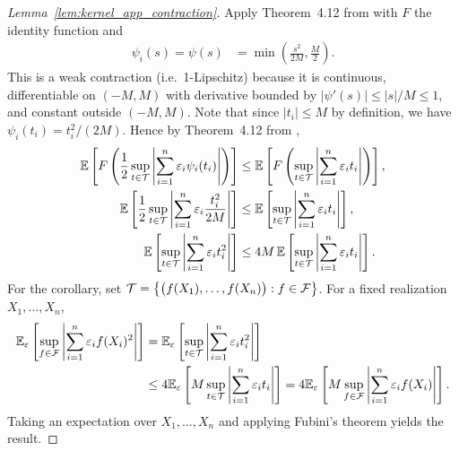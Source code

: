 \begin{proof}[Lemma~\ref{lem:kernel_app_contraction}]

  Apply Theorem~4.12 from \citet{ledoux1991probability} with $F$ the identity
  function and
  \begin{align*}
    \psi_i(s)
    = \psi(s)
    &=
    \min
    \left(
      \frac{s^2}{2M},
      \frac{M}{2}
    \right).
  \end{align*}
  This is a weak contraction
  (i.e.\ 1-Lipschitz)
  because it is continuous,
  differentiable on $(-M,M)$
  with derivative bounded by
  $|\psi'(s)| \leq |s|/M \leq 1$,
  and constant outside $(-M,M)$.
  Note that since $|t_i| \leq M$
  by definition,
  we have $\psi_i(t_i) = t_i^2 / (2M)$.
  Hence
  by Theorem~4.12
  from \citet{ledoux1991probability},
  \begin{align*}
    \mathbb{E}
    \left[
      F
      \left(
        \frac{1}{2}
        \sup_{t \in \mathcal{T}}
        \left|
        \sum_{i=1}^n
        \varepsilon_i
        \psi_i(t_i)
        \right|
      \right)
    \right]
    &\leq
    \mathbb{E}
    \left[
      F
      \left(
        \sup_{t \in \mathcal{T}}
        \left|
        \sum_{i=1}^n
        \varepsilon_i
        t_i
        \right|
      \right)
    \right], \\
    \mathbb{E}
    \left[
      \frac{1}{2}
      \sup_{t \in \mathcal{T}}
      \left|
      \sum_{i=1}^n
      \varepsilon_i
      \frac{t_i^2}{2M}
      \right|
    \right]
    &\leq
    \mathbb{E}
    \left[
      \sup_{t \in \mathcal{T}}
      \left|
      \sum_{i=1}^n
      \varepsilon_i
      t_i
      \right|
    \right], \\
    \mathbb{E}
    \left[
      \sup_{t \in \mathcal{T}}
      \left|
      \sum_{i=1}^n
      \varepsilon_i
      t_i^2
      \right|
    \right]
    &\leq
    4M \,
    \mathbb{E}
    \left[
      \sup_{t \in \mathcal{T}}
      \left|
      \sum_{i=1}^n
      \varepsilon_i
      t_i
      \right|
    \right].
  \end{align*}
  For the corollary, set
  $\mathcal{T} = \left\{\big(f(X_1), \ldots, f(X_n)\big) : f \in \mathcal{F}\right\}$.
  For a fixed realization
  $X_1, \ldots, X_n$,
  \begin{align*}
    \mathbb{E}_\varepsilon
    \left[
      \sup_{f \in \mathcal{F}}
      \left|
      \sum_{i=1}^n
      \varepsilon_i
      f(X_i)^2
      \right|
    \right]
    &=
    \mathbb{E}_\varepsilon
    \left[
      \sup_{t \in \mathcal{T}}
      \left|
      \sum_{i=1}^n
      \varepsilon_i
      t_i^2
      \right|
    \right] \\
    &\leq 4
    \mathbb{E}_\varepsilon
    \left[
      M
      \sup_{t \in \mathcal{T}}
      \left|
      \sum_{i=1}^n
      \varepsilon_i
      t_i
      \right|
    \right]
    = 4 \mathbb{E}_\varepsilon
    \left[
      M
      \sup_{f \in \mathcal{F}}
      \left|
      \sum_{i=1}^n
      \varepsilon_i
      f(X_i)
      \right|
    \right].
  \end{align*}
  Taking an expectation over $X_1, \ldots, X_n$
  and applying Fubini's theorem yields the result.
\end{proof}

